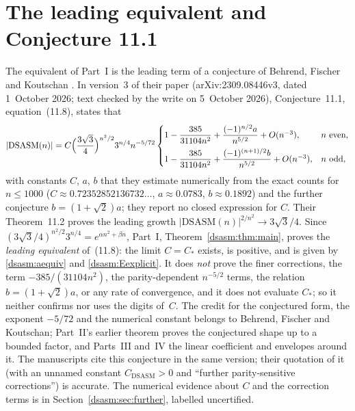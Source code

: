 \documentclass[11pt,letterpaper]{article}
\theoremstyle{remark}\newtheorem{remark}[theorem]{Remark}
\newcommand{\DS}{\mathrm{DSASM}}\newcommand{\ASM}{\mathrm{ASM}}
\begin{document}
\section*{The leading equivalent and Conjecture 11.1}\label{dsasm:sec:bfk}
The equivalent of Part~I is the leading term of a conjecture of Behrend, Fischer and Koutschan \cite{bfk}. In version~3 of their paper (arXiv:2309.08446v3, dated 1~October 2026; text checked by the write on 5~October 2026), Conjecture~11.1, equation~(11.8), states that
\[
 |\DS(n)|=C\Bigl(\frac{3\sqrt3}{4}\Bigr)^{n^2/2}3^{n/4}n^{-5/72}
 \begin{cases}
 1-\dfrac{385}{31104n^2}+\dfrac{(-1)^{n/2}a}{n^{5/2}}+O(n^{-3}), & n\text{ even},\\[8pt]
 1-\dfrac{385}{31104n^2}+\dfrac{(-1)^{(n+1)/2}b}{n^{5/2}}+O(n^{-3}), & n\text{ odd},
 \end{cases}
\]
with constants $C$, $a$, $b$ that they estimate numerically from the exact counts for $n\le1000$ ($C\approx0.72352852136732\ldots$, $a\approx0.0783$, $b\approx0.1892$) and the further conjecture $b=(1+\sqrt2)a$; they report no closed expression for $C$. Their Theorem~11.2 proves the leading growth $|\DS(n)|^{2/n^2}\to3\sqrt3/4$. Since $(3\sqrt3/4)^{n^2/2}3^{n/4}=e^{\alpha n^2+\beta n}$, Part~I, Theorem~\ref{dsasm:thm:main}, proves the \emph{leading equivalent} of~(11.8): the limit $C=C_*$ exists, is positive, and is given by \eqref{dsasm:aequiv} and \eqref{dsasm:Eexplicit}. It does \emph{not} prove the finer corrections, the term $-385/(31104n^2)$, the parity-dependent $n^{-5/2}$ terms, the relation $b=(1+\sqrt2)a$, or any rate of convergence, and it does not evaluate $C_*$; so it neither confirms nor uses the digits of~$C$. The credit for the conjectured form, the exponent $-5/72$ and the numerical constant belongs to Behrend, Fischer and Koutschan; Part~II's earlier theorem proves the conjectured shape up to a bounded factor, and Parts~III and~IV the linear coefficient and envelopes around it. The manuscripts cite this conjecture in the same version; their quotation of it (with an unnamed constant $C_{\DS}>0$ and ``further parity-sensitive corrections'') is accurate. The numerical evidence about $C$ and the correction terms is in Section~\ref{dsasm:sec:further}, labelled uncertified.
\end{document}
